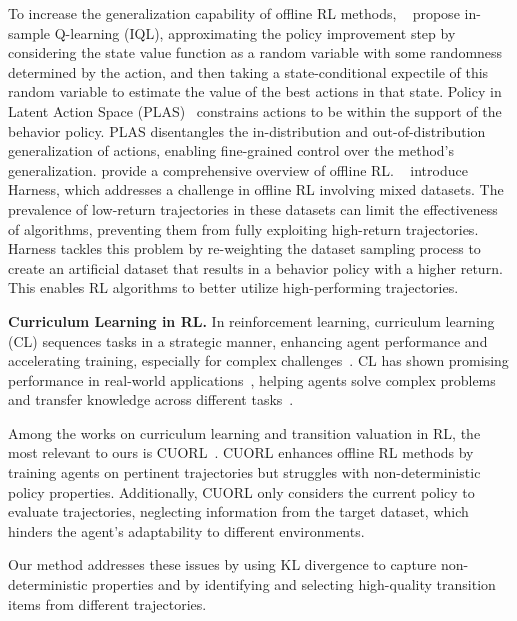 To increase the generalization capability of offline RL methods, ~\citep{kostrikov2021offline} propose in-sample Q-learning (IQL), approximating the policy improvement step by considering the state value function as a random variable with some randomness determined by the action, and then taking a state-conditional expectile of this random variable to estimate the value of the best actions in that state. 
Policy in Latent Action Space (PLAS)~\citep{zhou2021plas} constrains actions to be within the support of the behavior policy. PLAS disentangles the in-distribution and out-of-distribution generalization of actions, enabling fine-grained control over the method's generalization. \citep{prudencio2023survey} provide a comprehensive overview of offline RL. 
~\citep{hong2023harnessing} introduce Harness, which addresses a challenge in offline RL involving mixed datasets. The prevalence of low-return trajectories in these datasets can limit the effectiveness of algorithms, preventing them from fully exploiting high-return trajectories. Harness tackles this problem by re-weighting the dataset sampling process to create an artificial dataset that results in a behavior policy with a higher return. This enables RL algorithms to better utilize high-performing trajectories.


\vspace{0.5em}
\noindent\textbf{Curriculum Learning in RL.}
In reinforcement learning, curriculum learning (CL) sequences tasks in a strategic manner, enhancing agent performance and accelerating training, especially for complex challenges~\citep{narvekar2020curriculum,turchetta2020safe,liu2021curriculum,ren2018self}. CL has shown promising performance in real-world applications~\citep{xu2019macro,el2020student,matavalam2022curriculum}, helping agents solve complex problems and transfer knowledge across different tasks~\citep{narvekar2020curriculum,klink2021boosted}.


Among the works on curriculum learning and transition valuation in RL, the most relevant to ours is CUORL~\citep{cai2023curriculum}. CUORL enhances offline RL methods by training agents on pertinent trajectories but struggles with non-deterministic policy properties. Additionally, CUORL only considers the current policy to evaluate trajectories, neglecting information from the target dataset, which hinders the agent's adaptability to different environments. 

Our method addresses these issues by using KL divergence to capture non-deterministic properties and by identifying and selecting high-quality transition items from different trajectories.
